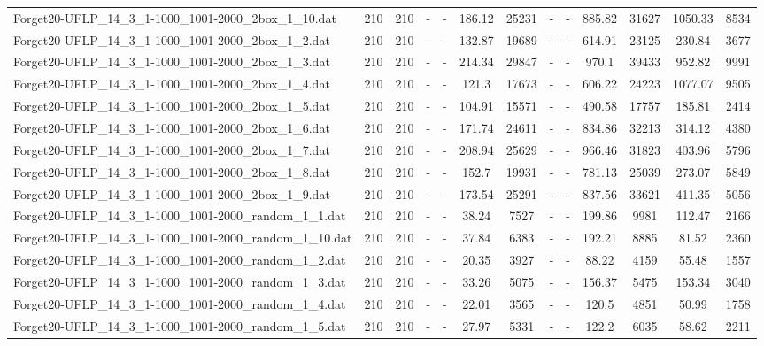 \begin{table}[!ht]
{\begin{tabular}{lcccccccccccc}
Forget20-UFLP\_14\_3\_1-1000\_1001-2000\_2box\_1\_10.dat & 210 & 210 &  - &  - & 186.12 & 25231 &  - &  - & 885.82 & 31627 & 1050.33 & 8534 \\
Forget20-UFLP\_14\_3\_1-1000\_1001-2000\_2box\_1\_2.dat & 210 & 210 &  - &  - & 132.87 & 19689 &  - &  - & 614.91 & 23125 & 230.84 & 3677 \\
Forget20-UFLP\_14\_3\_1-1000\_1001-2000\_2box\_1\_3.dat & 210 & 210 &  - &  - & 214.34 & 29847 &  - &  - & 970.1 & 39433 & 952.82 & 9991 \\
Forget20-UFLP\_14\_3\_1-1000\_1001-2000\_2box\_1\_4.dat & 210 & 210 &  - &  - & 121.3 & 17673 &  - &  - & 606.22 & 24223 & 1077.07 & 9505 \\
Forget20-UFLP\_14\_3\_1-1000\_1001-2000\_2box\_1\_5.dat & 210 & 210 &  - &  - & 104.91 & 15571 &  - &  - & 490.58 & 17757 & 185.81 & 2414 \\
Forget20-UFLP\_14\_3\_1-1000\_1001-2000\_2box\_1\_6.dat & 210 & 210 &  - &  - & 171.74 & 24611 &  - &  - & 834.86 & 32213 & 314.12 & 4380 \\
Forget20-UFLP\_14\_3\_1-1000\_1001-2000\_2box\_1\_7.dat & 210 & 210 &  - &  - & 208.94 & 25629 &  - &  - & 966.46 & 31823 & 403.96 & 5796 \\
Forget20-UFLP\_14\_3\_1-1000\_1001-2000\_2box\_1\_8.dat & 210 & 210 &  - &  - & 152.7 & 19931 &  - &  - & 781.13 & 25039 & 273.07 & 5849 \\
Forget20-UFLP\_14\_3\_1-1000\_1001-2000\_2box\_1\_9.dat & 210 & 210 &  - &  - & 173.54 & 25291 &  - &  - & 837.56 & 33621 & 411.35 & 5056 \\
Forget20-UFLP\_14\_3\_1-1000\_1001-2000\_random\_1\_1.dat & 210 & 210 &  - &  - & 38.24 & 7527 &  - &  - & 199.86 & 9981 & 112.47 & 2166 \\
Forget20-UFLP\_14\_3\_1-1000\_1001-2000\_random\_1\_10.dat & 210 & 210 &  - &  - & 37.84 & 6383 &  - &  - & 192.21 & 8885 & 81.52 & 2360 \\
Forget20-UFLP\_14\_3\_1-1000\_1001-2000\_random\_1\_2.dat & 210 & 210 &  - &  - & 20.35 & 3927 &  - &  - & 88.22 & 4159 & 55.48 & 1557 \\
Forget20-UFLP\_14\_3\_1-1000\_1001-2000\_random\_1\_3.dat & 210 & 210 &  - &  - & 33.26 & 5075 &  - &  - & 156.37 & 5475 & 153.34 & 3040 \\
Forget20-UFLP\_14\_3\_1-1000\_1001-2000\_random\_1\_4.dat & 210 & 210 &  - &  - & 22.01 & 3565 &  - &  - & 120.5 & 4851 & 50.99 & 1758 \\
Forget20-UFLP\_14\_3\_1-1000\_1001-2000\_random\_1\_5.dat & 210 & 210 &  - &  - & 27.97 & 5331 &  - &  - & 122.2 & 6035 & 58.62 & 2211 \\

\end{tabular}}
\end{table}
